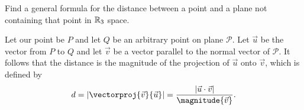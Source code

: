 \documentclass[12pt]{scrartcl}
\begin{document}
\begin{example}
    Find a general formula for the distance between a point and a plane not containing that point in $\mathbb R_{3}$ space.

    \begin{soln}
        Let our point be $P$ and let $Q$ be an arbitrary point on plane $\mathcal{P}$. Let $\vec{u}$ be the vector from $P$ to $Q$ and let $\vec{v}$ be a vector parallel to the normal vector of $\mathcal{P}$. It follows that the distance is the magnitude of the projection of $\vec{u}$ onto $\vec{v}$, which is defined by
        \[d = \abs{\vectorproj{\vec{v}}{\vec{u}}} = \frac{\abs{\vec{u} \cdot \vec{v}}}{\magnitude{\vec{v}}}.\]
    \end{soln}
\end{example}
\end{document}
